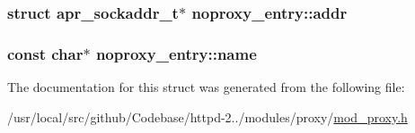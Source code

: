 \subsubsection[{\texorpdfstring{addr}{addr}}]{\setlength{\rightskip}{0pt plus 5cm}struct {\bf apr\+\_\+sockaddr\+\_\+t}$\ast$ noproxy\+\_\+entry\+::addr}\hypertarget{structnoproxy__entry_a5d7a8b77b9f4d5b1be6c266ba8d31670}{}\label{structnoproxy__entry_a5d7a8b77b9f4d5b1be6c266ba8d31670}
\subsubsection[{\texorpdfstring{name}{name}}]{\setlength{\rightskip}{0pt plus 5cm}const char$\ast$ noproxy\+\_\+entry\+::name}\hypertarget{structnoproxy__entry_a579cae065408f00adde1bb78d09fb339}{}\label{structnoproxy__entry_a579cae065408f00adde1bb78d09fb339}


The documentation for this struct was generated from the following file\+:\begin{DoxyCompactItemize}
\item 
/usr/local/src/github/\+Codebase/httpd-\/2../modules/proxy/\hyperlink{mod__proxy_8h}{mod\+\_\+proxy.\+h}\end{DoxyCompactItemize}
